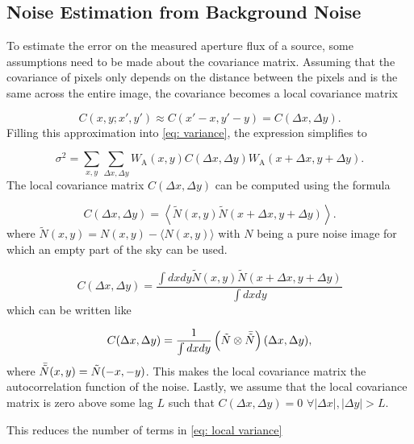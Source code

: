 \newpage
\subsection{Noise Estimation from Background Noise}\label{subsec: Noise Estimation from background Noise}

To estimate the error on the measured aperture flux of a source, some assumptions need to be made about the covariance matrix. 
Assuming that the covariance of pixels only depends on the distance between the pixels and is the same across the entire image, the covariance becomes a local covariance matrix

\begin{equation}
    C(x,y;x',y') \approx C(x'-x,y'-y)=C(\Delta x, \Delta y).
\end{equation}
Filling this approximation into \autoref{eq: variance}, the expression simplifies to 

\begin{equation}\label{eq: local variance}
    \sigma^2 = \sum_{x,y}\sum_{\Delta x,\Delta y}W_\mathrm{A}(x,y)C(\Delta x, \Delta y)W_\mathrm{A}(x+\Delta x,y + \Delta y).
\end{equation}
The local covariance matrix $C(\Delta x, \Delta y)$ can be computed using the formula

\begin{equation}
    C(\Delta x, \Delta y) = \left\langle \tilde{N}(x,y)\tilde{N}(x+\Delta x,y+\Delta y)\right\rangle.
\end{equation}
where $\tilde{N}(x,y)=N(x,y) - \langle N(x,y)\rangle$ with $N$ being a pure noise image for which an empty part of the sky can be used.

\begin{equation}
    C(\Delta x, \Delta y) = \frac{\int dx dy \tilde{N}(x,y)\tilde{N}(x+\Delta x,y+\Delta y)}{\int dx dy} 
\end{equation}
which can be written like

\begin{equation}
    C(\Delta x, \Delta y) = \frac{1}{\int dx dy}\left(\tilde{N} \otimes\Bar{\tilde{N}}\right)(\Delta x, \Delta y),
\end{equation}
where $\Bar{\tilde{N}}(x,y)=\tilde{N}(-x,-y)$. This makes the local covariance matrix the autocorrelation function of the noise.
Lastly, we assume that the local covariance matrix is zero above some lag $L$ such that $C(\Delta x, \Delta y) = 0$ $\forall|\Delta x|, |\Delta y| > L$.

\noindent This reduces the number of terms in \autoref{eq: local variance}

